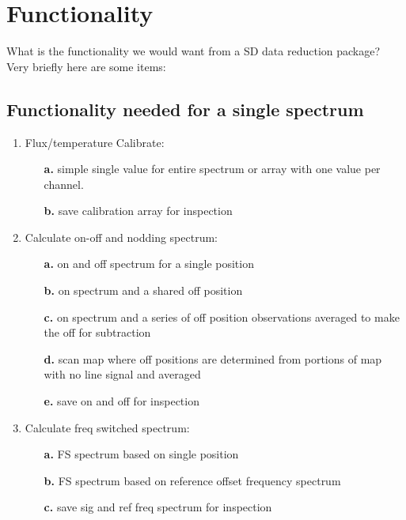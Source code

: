 \documentclass[12pt,a4paper]{article}
\begin{document}
\section{Functionality}

What is the functionality we would want from a SD data reduction
package? Very briefly here are some items:


\subsection{Functionality needed for a single spectrum}

\begin{enumerate}

\item Flux/temperature Calibrate: 
  \begin{itemize}
    \item[{\bf a.}]
    simple single value for entire spectrum or array with one 
       value per channel.
    \item[{\bf b.}]
   save calibration array for inspection
    
  \end{itemize}

\item Calculate on-off and nodding spectrum:
  \begin{itemize}
  \item[{\bf a.}]
    on and off spectrum for a single position
  \item[{\bf b.}]   
    on spectrum and a shared off position
  \item[{\bf c.}]   
    on spectrum and a series of off position observations
    averaged to make the off for subtraction
  \item[{\bf d.}]   
    scan map where off positions are determined from
    portions of map with no line signal and averaged
  \item[{\bf e.}]   
    save on and off for inspection
  \end{itemize}

\item   Calculate freq switched spectrum:
  \begin{itemize}
  \item[{\bf a.}]   
    FS spectrum based on single position
  \item[{\bf b.}]   
    FS spectrum based on reference offset frequency spectrum
  \item[{\bf c.}]   
    save sig and ref freq spectrum for inspection
  \end{itemize}


\end{enumerate}
\end{document}
